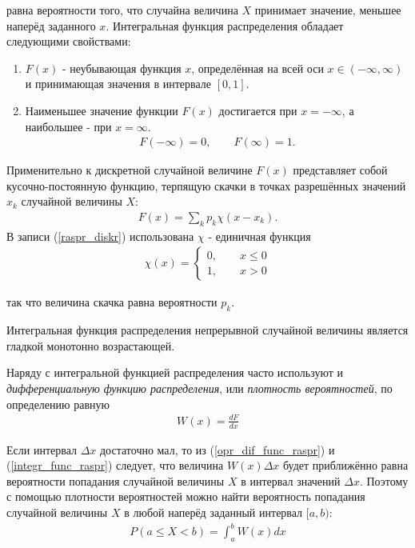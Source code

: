 равна вероятности того, что случайна величина $X$ принимает значение, меньшее наперёд заданного $x$. Интегральная функция распределения обладает следующими свойствами:
\begin{enumerate}
	\item $F(x)$ - неубывающая функция $x$, определённая на всей оси $x\in(-\infty,\infty)$ и принимающая значения в интервале $[0, 1]$.
	\item {Наименьшее значение функции $F(x)$ достигается при $x = -\infty$, а наибольшее - при $x = \infty$.
	\begin{align}
		F(-\infty)=0, \qquad F(\infty) = 1.
	\end{align}
	}
\end{enumerate}

Применительно к дискретной случайной величине $F(x)$ представляет собой кусочно-постоянную функцию, терпящую скачки в точках разрешённых значений $x_k$ случайной величины $X$:
\begin{align} \label{raspr_diskr}
	F(x) = \sum_{k}{p_k \chi (x - x_k).}
\end{align}
В записи (\ref{raspr_diskr}) использована $\chi$ - единичная функция 
\begin{align}
	\chi(x) = \left \{ 
	\begin{aligned}
		0, \qquad x \leq 0 \\
		1, \qquad x > 0
	\end{aligned} \right.
\end{align}

так что величина скачка равна вероятности $p_k$.

Интегральная функция распределения непрерывной случайной величины является гладкой монотонно возрастающей.

Наряду с интегральной функцией распределения часто используют и \textit{дифференциальную функцию распределения}, или \textit{плотность вероятностей}, по определению равную 
\begin{align} \label{opr_dif_func_raspr}
	W(x) = \frac{dF}{dx}
\end{align}

 Если интервал $\Delta x$ достаточно мал, то из (\ref{opr_dif_func_raspr}) и (\ref{integr_func_raspr})  следует, что величина $W(x)\Delta x$ будет приближённо равна вероятности попадания случайной величины $X$ в интервал значений $\Delta x$. Поэтому с помощью плотности вероятностей можно найти вероятность попадания случайной величины $X$ в любой наперёд заданный интервал $[a, b)$:
 \begin{align}
 	P(a \leq X < b) = \int_{a}^{b}{W(x)dx}
 \end{align}
 
